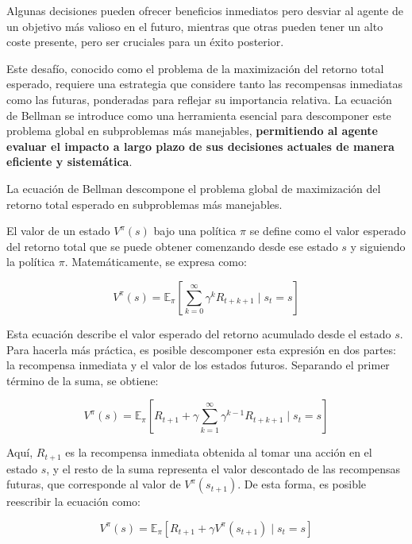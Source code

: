 \documentclass[a4paper,12pt, twoside]{report}
\begin{document}
Algunas decisiones pueden ofrecer beneficios inmediatos pero desviar al agente de un objetivo 
más valioso en el futuro, mientras que otras pueden tener un alto coste presente, pero ser 
cruciales para un éxito posterior.

Este desafío, conocido como el problema de la maximización del retorno total esperado, 
requiere una estrategia que considere tanto las recompensas inmediatas como las futuras, 
ponderadas para reflejar su importancia relativa. La ecuación de Bellman se introduce como 
una herramienta esencial para descomponer este problema global en subproblemas más manejables, 
\textbf{permitiendo al agente evaluar el impacto a largo plazo de sus decisiones actuales de 
manera eficiente y sistemática}.

La ecuación de Bellman descompone el problema global de maximización del retorno total 
esperado en subproblemas más manejables. 

El valor de un estado \(V^\pi(s)\) bajo una política \(\pi\) se define como el valor esperado 
del retorno total que se puede obtener comenzando desde ese estado \(s\) y siguiendo la política 
\(\pi\). Matemáticamente, se expresa como:

\begin{equation}
V^\pi(s) = \mathbb{E}_\pi \left[ \sum_{k=0}^{\infty} \gamma^k R_{t+k+1} \mid s_t = s \right]
\end{equation}

Esta ecuación describe el valor esperado del retorno acumulado desde el estado \(s\). 
Para hacerla más práctica, es posible descomponer esta expresión en dos partes: la 
recompensa inmediata y el valor de los estados futuros. Separando el primer término de 
la suma, se obtiene:

\begin{equation}
V^\pi(s) = \mathbb{E}_\pi \left[ R_{t+1} + \gamma \sum_{k=1}^{\infty} \gamma^{k-1} R_{t+k+1} \mid s_t = s \right]
\end{equation}

Aquí, \(R_{t+1}\) es la recompensa inmediata obtenida al tomar una acción en el estado \(s\), 
y el resto de la suma representa el valor descontado de las recompensas futuras, que 
corresponde al valor de \(V^\pi(s_{t+1})\). De esta forma, es posible reescribir la ecuación como:

\begin{equation}
V^\pi(s) = \mathbb{E}_\pi \left[ R_{t+1} + \gamma V^\pi(s_{t+1}) \mid s_t = s \right]
\end{equation}
\end{document}
